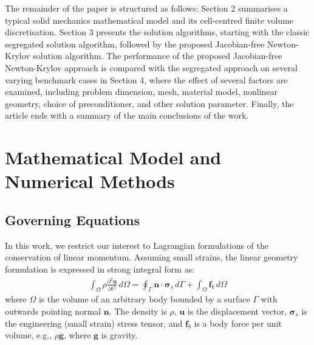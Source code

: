 \documentclass[sn-mathphys,Numbered]{sn-jnl}%
\newcommand{\bb}{\boldsymbol}
\begin{document}
The remainder of the paper is structured as follows:
Section 2 summarises a typical solid mechanics mathematical model and its cell-centred finite volume discretisation.
Section 3 presents the solution algorithms, starting with the classic segregated solution algorithm, followed by the proposed Jacobian-free Newton-Krylov solution algorithm.
The performance of the proposed Jacobian-free Newton-Krylov approach is compared with the segregated approach on several varying benchmark cases in Section 4, where the effect of several factors are examined, including problem dimension, mesh, material model, nonlinear geometry, choice of preconditioner, and other solution parameter.
Finally, the article ends with a summary of the main conclusions of the work.


\section{Mathematical Model and Numerical Methods}\label{sec:math_model}

%

\subsection{Governing Equations} \label{sec:governing_eqn}

In this work, we restrict our interest to Lagrangian formulations of the conservation of linear momentum.
Assuming small strains, the linear geometry formulation is expressed in strong integral form as:
\begin{eqnarray} \label{eqn:momentum_lingeom}
    \int_{\Omega} \rho \frac{\partial^2 \bb{u} }{\partial t^2} \, d\Omega
    =
    \oint_{\Gamma} \bb{n} \cdot \bb{\sigma}_s \,  d\Gamma
    + \int_{\Omega}  \bb{f}_b \, d\Omega
\end{eqnarray}
where $\Omega$ is the volume of an arbitrary body bounded by a surface $\Gamma$ with outwards pointing normal $\bb{n}$.
The density is $\rho$, $\bb{u}$ is the displacement vector, $\bb{\sigma}_s$ is the engineering (small strain) stress tensor, and $\bb{f}_b$ is a body force per unit volume, e.g., $\rho \bb{g}$, where $\bb{g}$ is gravity.
\end{document}
